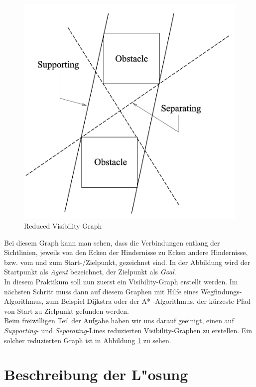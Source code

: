 \documentclass[a4paper]{scrartcl}
\begin{document}
\begin{figure}[h!]
\includegraphics[width=\textwidth]{Reduced.PNG}
\caption{Reduced Visibility Graph}
\label{img:RedGraph}
\end{figure}
Bei diesem Graph kann man sehen, dass die Verbindungen entlang der Sichtlinien, jeweils von den Ecken der Hindernisse zu Ecken andere Hindernisse, bzw. vom und zum Start-/Zielpunkt, gezeichnet sind. In der Abbildung wird der Startpunkt als \textit{Agent} bezeichnet, der Zielpunkt als \textit{Goal}.\\

In diesem Praktikum soll nun zuerst ein Visibility-Graph erstellt werden. Im nächsten Schritt muss dann auf diesem Graphen mit Hilfe eines Wegfindungs-Algorithmus, zum Beispiel Dijkstra oder der A* -Algorithmus, der kürzeste Pfad von Start zu Zielpunkt gefunden werden.\\

Beim freiwilligen Teil der Aufgabe haben wir uns darauf geeinigt, einen auf \textit{Supporting}- und \textit{Separating}-Lines reduzierten Visibility-Graphen zu erstellen. Ein solcher reduzierten Graph ist in Abbildung \ref{img:RedGraph} zu sehen.
\section*{Beschreibung der L"osung}
\end{document}

